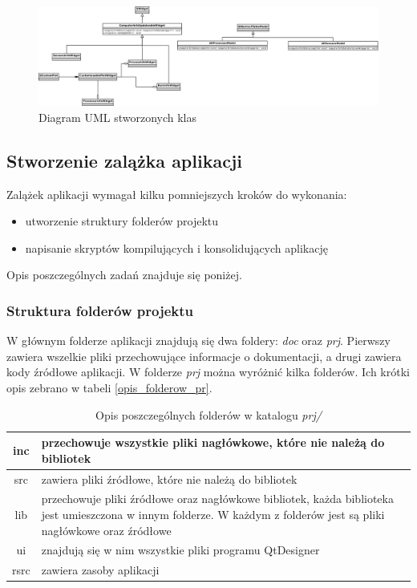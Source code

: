 \documentclass[a4paper]{article}
\begin{document}
\begin{figure}[h]
	\centering
	\includegraphics[width=0.75\paperheight, angle=90]{img/diagramKlasGui.png}
	\caption{Diagram UML stworzonych klas}
	\label{diagram_klas_gui}
\end{figure}

\subsection{Stworzenie zalążka aplikacji}

Zalążek aplikacji wymagał kilku pomniejszych kroków do wykonania:
\begin{itemize}
	\item utworzenie struktury folderów projektu
	\item napisanie skryptów kompilujących i konsolidujących aplikację
\end{itemize}
Opis poszczególnych zadań znajduje się poniżej.

\subsubsection{Struktura folderów projektu}
W głównym folderze aplikacji znajdują się dwa foldery: \textit{doc} oraz \textit{prj}. Pierwszy zawiera wszelkie pliki przechowujące informacje o dokumentacji, a drugi zawiera kody źródłowe aplikacji. W folderze \textit{prj} można wyróżnić kilka folderów. Ich krótki opis zebrano w tabeli \ref{opis_folderow_pr}.

\begin{table}
\centering
\begin{tabularx}{0.7\linewidth}{|c|X|}
	\hline
	inc & przechowuje wszystkie pliki nagłówkowe, które nie należą do bibliotek \\ \hline
	src & zawiera pliki źródłowe, które nie należą do bibliotek \\ \hline
	lib & przechowuje pliki źródłowe oraz nagłówkowe bibliotek, każda biblioteka jest umieszczona 
		  w innym folderze. W każdym z folderów jest są pliki nagłówkowe oraz źródłowe \\ \hline
	ui & znajdują się w nim wszystkie pliki  programu QtDesigner \\ \hline
	rsrc  & zawiera zasoby aplikacji \\ \hline
\end{tabularx}

\label{opis_folderow_prj}
\caption{Opis poszczególnych folderów w katalogu \textit{prj/}}
\end{table}
\end{document}
